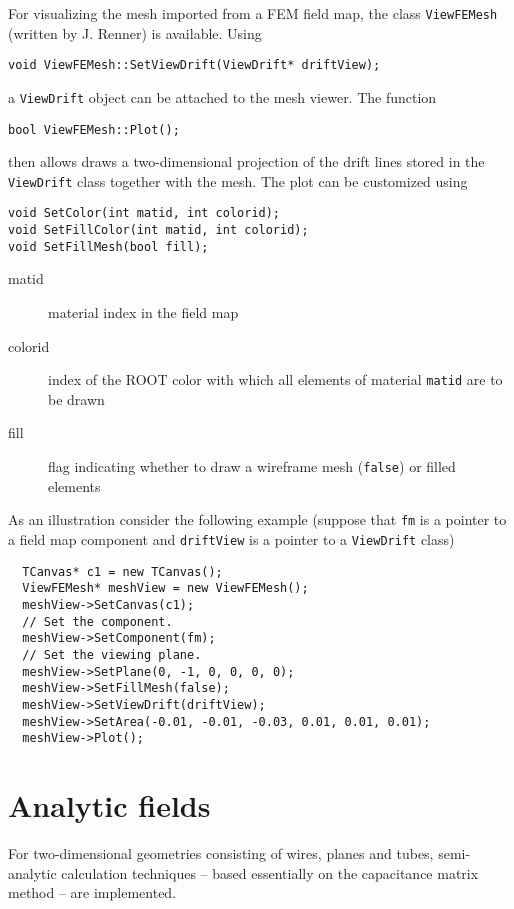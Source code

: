For visualizing the mesh imported from a FEM field map, the class 
\texttt{ViewFEMesh} (written by J. Renner) is available. 
Using 
\begin{lstlisting}
void ViewFEMesh::SetViewDrift(ViewDrift* driftView);
\end{lstlisting}
a \texttt{ViewDrift} object can be attached to the mesh viewer. 
The function
\begin{lstlisting}
bool ViewFEMesh::Plot();
\end{lstlisting}
then allows draws a two-dimensional projection of the drift lines stored in the  
\texttt{ViewDrift} class together with the mesh. 
The plot can be customized using 
\begin{lstlisting}
void SetColor(int matid, int colorid);
void SetFillColor(int matid, int colorid);
void SetFillMesh(bool fill);
\end{lstlisting}
\begin{description}
  \item[matid] material index in the field map
  \item[colorid] index of the ROOT color with which all elements of material 
                 \texttt{matid} are to be drawn 
  \item[fill] flag indicating whether to draw a wireframe mesh (\texttt{false}) 
              or filled elements
\end{description}
As an illustration consider the following example 
(suppose that \texttt{fm} is a pointer to a field map component 
and \texttt{driftView} is a pointer to a \texttt{ViewDrift} class) 
\begin{lstlisting}
  TCanvas* c1 = new TCanvas();
  ViewFEMesh* meshView = new ViewFEMesh();
  meshView->SetCanvas(c1);
  // Set the component.
  meshView->SetComponent(fm);
  // Set the viewing plane.
  meshView->SetPlane(0, -1, 0, 0, 0, 0);
  meshView->SetFillMesh(false);
  meshView->SetViewDrift(driftView);
  meshView->SetArea(-0.01, -0.01, -0.03, 0.01, 0.01, 0.01);
  meshView->Plot();
\end{lstlisting}

\section{Analytic fields}

For two-dimensional geometries consisting of wires, planes and tubes, 
semi-analytic calculation techniques -- based essentially 
on the capacitance matrix method -- are implemented.

